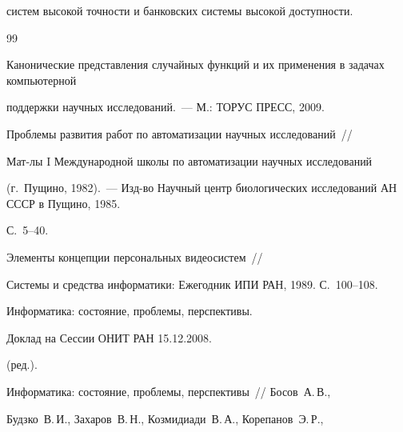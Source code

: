 сис\-тем высокой точности и банковских системы высокой доступности.





{\small\frenchspacing


{%




\begin{thebibliography}{99}






Канонические представления случайных функций и их применения в задачах компьютерной 


поддержки научных исследований.~--- М.: ТОРУС ПРЕСС, 2009.









Проблемы развития работ по автоматизации научных исследований~/\!\!/


Мат-лы I Международной школы по автоматизации научных исследований


(г.~Пущино, 1982).~--- Изд-во Научный центр биологических исследований АН СССР в Пущино, 1985.


С.~5--40.









Элементы концепции персональных видеосистем~/\!\!/


Системы и средства информатики: Ежегодник ИПИ РАН, 1989. С.~100--108.







  Информатика: состояние, проблемы, перспективы. 


Доклад на Сессии ОНИТ РАН 15.12.2008.







 (ред.). 


Информатика: состояние, проблемы, перспективы~/\!\!/ Босов~А.\,В., 


Будзко~В.\,И., Захаров~В.\,Н., Козмидиади~В.\,А., Корепанов~Э.\,Р., 



\end{thebibliography}}}
